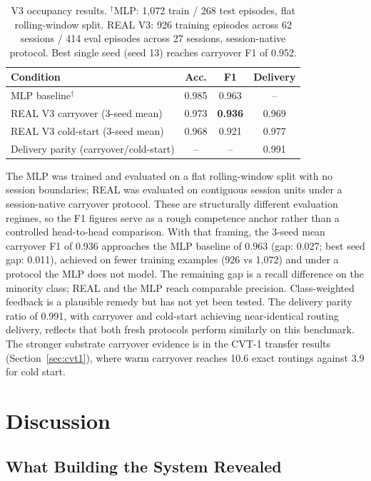 \documentclass[letterpaper]{article}
\begin{document}
\begin{table}[ht]
  \centering
  \small
  \begin{tabular}{lccc}
    \toprule
    Condition & Acc. & F1 & Delivery \\
    \midrule
    MLP baseline$^{\dagger}$                    & 0.985 & 0.963 & --    \\
    REAL V3 carryover (3-seed mean)             & 0.973 & \textbf{0.936} & 0.969 \\
    REAL V3 cold-start (3-seed mean)            & 0.968 & 0.921 & 0.977 \\
    Delivery parity (carryover/cold-start)      & --    & --    & 0.991 \\
    \bottomrule
  \end{tabular}
  \caption{V3 occupancy results. $^{\dagger}$MLP: 1,072 train / 268 test
  episodes, flat rolling-window split. REAL V3: 926 training episodes across 62
  sessions / 414 eval episodes across 27 sessions, session-native protocol.
  Best single seed (seed 13) reaches carryover F1 of 0.952.}
  \label{tab:occupancy}
\end{table}

The MLP was trained and evaluated on a flat rolling-window split with no session
boundaries; REAL was evaluated on contiguous session units under a session-native
carryover protocol. These are structurally different evaluation regimes, so the
F1 figures serve as a rough competence anchor rather than a controlled
head-to-head comparison. With that framing, the 3-seed mean carryover F1 of 0.936
approaches the MLP baseline of 0.963 (gap: 0.027; best seed gap: 0.011), achieved
on fewer training examples (926 vs 1,072) and under a protocol the MLP does not
model. The
remaining gap is a recall difference on the minority class; REAL and the MLP reach
comparable precision. Class-weighted feedback is a plausible remedy but has not
yet been tested. The delivery parity ratio of 0.991, with carryover and cold-start
achieving near-identical routing delivery, reflects that both fresh protocols
perform similarly on this benchmark. The stronger substrate carryover evidence is
in the CVT-1 transfer results (Section~\ref{sec:cvt1}), where warm carryover
reaches 10.6 exact routings against 3.9 for cold start.

\section{Discussion}

\subsection{What Building the System Revealed}
\end{document}
